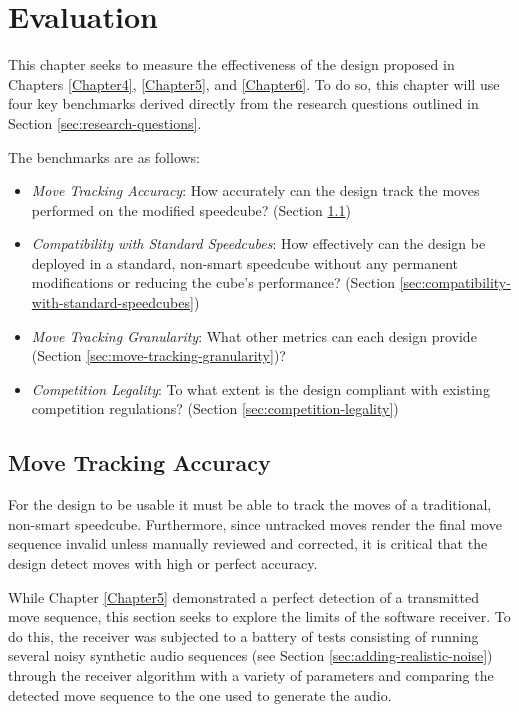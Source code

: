 \chapter{Evaluation}
\label{Chapter7}

This chapter seeks to measure the effectiveness of the design proposed
in Chapters \ref{Chapter4}, \ref{Chapter5}, and \ref{Chapter6}. To do
so, this chapter will use four key benchmarks derived directly from the
research questions outlined in Section \ref{sec:research-questions}.

The benchmarks are as follows:

\begin{itemize}

    \item \emph{Move Tracking Accuracy}: How accurately can the design
    track the moves performed on the modified speedcube? (Section
    \ref{sec:move-tracking-accuracy})

    \item \emph{Compatibility with Standard Speedcubes}: How
    effectively can the design be deployed in a standard, non-smart
    speedcube without any permanent modifications or reducing the
    cube's performance? (Section
    \ref{sec:compatibility-with-standard-speedcubes})
    
    \item \emph{Move Tracking Granularity}: What other metrics can each 
    design provide (Section \ref{sec:move-tracking-granularity})?
    
    \item \emph{Competition Legality}: To what extent is the design
    compliant with existing competition regulations? (Section
    \ref{sec:competition-legality})
    
\end{itemize}


\section{Move Tracking Accuracy}
\label{sec:move-tracking-accuracy}

For the design to be usable it must be able to track the moves of a
traditional, non-smart speedcube. Furthermore, since untracked moves
render the final move sequence invalid unless manually reviewed and
corrected, it is critical that the design detect moves with high or
perfect accuracy.

While Chapter \ref{Chapter5} demonstrated a perfect detection of a
transmitted move sequence, this section seeks to explore the limits of
the software receiver. To do this, the receiver was subjected to a
battery of tests consisting of running several noisy synthetic audio
sequences (see Section \ref{sec:adding-realistic-noise}) through the
receiver algorithm with a variety of parameters and comparing the
detected move sequence to the one used to generate the audio.

